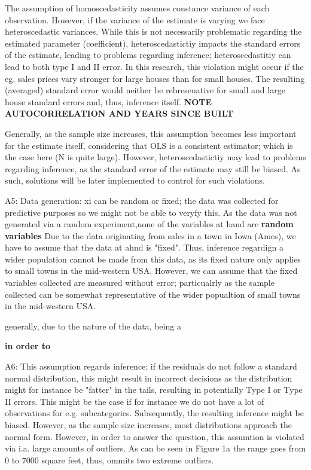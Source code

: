 \documentclass[a4paper]{article}
\begin{document}
The assumption of homoscedasticity assumes constance variance of each observation. However, if the variance of the estimate is varying we face heteroscedastic variances. While this is not necessarily problematic regarding the estimated parameter (coefficient), heteroscedastictiy impacts the standard errors of the estimate, leading to problems regarding inference; heteroscedastitiy can lead to both type I and II error. In this research, this violation might occur if the eg. sales prices vary stronger for large houses than for small houses. The resulting (averaged) standard error would neither be rebresenative for small and large house standard errors and, thus, inference itself.
\textbf{NOTE AUTOCORRELATION AND YEARS SINCE BUILT}

Generally, as the sample size increases, this assumption becomes less important for the estimate itself, considering that OLS is a consistent estimator; which is the case here (N is quite large). However, heteroscedastictiy may lead to problems regarding inference, as the standard error of the estimate may still be biased. As such, solutions will be later implemented to control for such violations.



A5: Data generation: xi can be random or fixed; the data was collected for predictive purposes so we might not be able to veryfy this. As the data was not generated via a random experiment,none of the variables at hand are \textbf{random variables}
Due to the data originating from sales in a town in Iowa (Ames), we have to assume that the data at ahnd is "fixed". Thus, inference regardign a wider population cannot be made from this data, as its fixed nature only applies to small towns in the mid-western USA. However, we can assume that the fixed variables collected are measured without error; particualrly as the sample collected can be somewhat representative of the wider popualtion of small towns in the mid-western USA. 


generally, due to the nature of the data, being a 

\textbf{in order to }

A6: This assumption regards inference; if the residuals do not follow a standard normal distribution, this might result in incorrect decisions as the distribution might for instance be "fatter" in the tails, resulting in potentially Type I or Type II errors. This might be the case if for instance we do not have a lot of observations for e.g. subcategories. Subsequently, the resulting inference might be biased. However, as the sample size increases, most distributions approach the normal form. 
However, in order to answer the question, this assumtion is violated via i.a. large amounts of outliers. As can be seen in Figure 1a the range goes from 0 to 7000 square feet, thus, ommits two extreme outliers.
\end{document}
